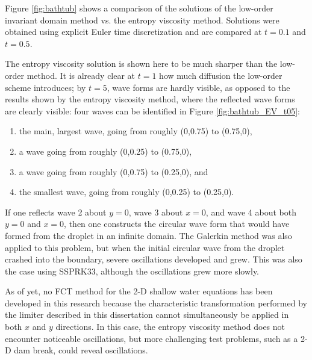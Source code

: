 Figure \ref{fig:bathtub} shows a comparison of the solutions of the low-order
invariant domain method vs. the entropy viscosity method. Solutions were obtained
using explicit Euler time discretization and are compared at $t = 0.1$ and
$t = 0.5$.

The entropy viscosity solution is shown here to be much sharper than
the low-order method. It is already
clear at $t = 1$ how much diffusion the low-order scheme introduces; by
$t = 5$, wave forms are hardly visible, as opposed to the results shown
by the entropy viscosity method, where the reflected wave forms are
clearly visible: four waves can be identified in Figure \ref{fig:bathtub_EV_t05}:
\begin{enumerate}
  \item the main, largest wave, going from roughly (0,0.75) to (0.75,0),
  \item a wave going from roughly (0,0.25) to (0.75,0),
  \item a wave going from roughly (0,0.75) to (0.25,0), and
  \item the smallest wave, going from roughly (0,0.25) to (0.25,0).
\end{enumerate}
If one reflects wave 2 about $y=0$, wave 3 about $x=0$, and wave 4 about
both $y=0$ and $x=0$, then one constructs the circular wave form
that would have formed from the droplet in an infinite domain.
The Galerkin method was also applied to this problem, but
when the initial circular wave from the droplet crashed into the boundary,
severe oscillations developed and grew. This was also the case using
SSPRK33, although the oscillations grew more slowly.

As of yet, no FCT method for the 2-D shallow water equations has
been developed in this research because the characteristic transformation performed by the
limiter described in this dissertation cannot simultaneously be applied in
both $x$ and $y$ directions. In this case, the entropy viscosity method
does not encounter noticeable oscillations, but more challenging test
problems, such as a 2-D dam break, could reveal oscillations.

